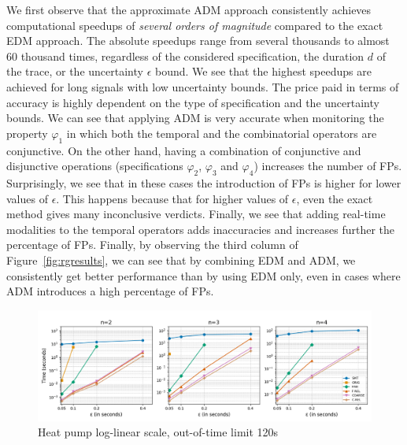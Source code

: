 We first observe that the approximate ADM approach consistently achieves computational speedups of \emph{several orders of magnitude} 
compared to the exact EDM approach. The absolute speedups range from several thousands to almost 60 thousand times, regardless of the considered specification, the duration $d$ of the trace, or the uncertainty $\epsilon$ bound. We see that the highest speedups are achieved for long signals with low uncertainty bounds. The price paid in terms of accuracy is highly dependent on the type of specification and the uncertainty bounds. We can see that applying ADM is very accurate when monitoring the property 
$\varphi_1$ in which both the temporal and the combinatorial operators are conjunctive. On the other hand, having a combination of conjunctive and disjunctive operations (specifications $\varphi_{2}$, $\varphi_{3}$ and $\varphi_{4}$) increases the number of FPs.  Surprisingly, we see that in these cases the introduction of FPs is higher for lower values of $\epsilon$. This happens because that for higher values of $\epsilon$,  even the exact method gives many inconclusive verdicts. Finally, we see that adding real-time modalities to the temporal operators adds inaccuracies and increases further the percentage of FPs. Finally, by observing the third column of Figure~\ref{fig:rgresults}, we can see that by combining EDM and ADM, we consistently get better performance than by using EDM only, even in cases where ADM introduces a high percentage of FPs.


\begin{figure}[htb]
	\begin{center}
		\includegraphics[width=\linewidth]{wtlin.png}
		\caption{Heat pump log-linear scale, out-of-time limit 120s}
	\end{center}
\end{figure}

